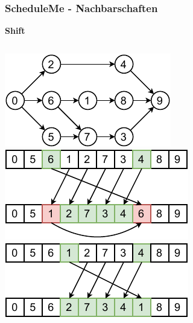 \documentclass[aspectratio=169]{beamer}
\begin{document}

\begin{frame}
\frametitle{ScheduleMe - Nachbarschaften}
\textbf{Shift}
\begin{columns}[c] %
	\includegraphics[scale=1.3]{../images/tree.pdf}	
	\includegraphics[scale=1.2]{../images/shift0.pdf}
	\includegraphics[scale=1.2]{../images/shift1.pdf}	
\end{columns}
\end{frame}

\end{document}
